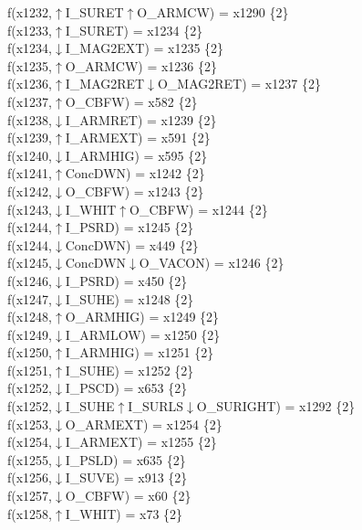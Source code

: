 f(x1232,$\uparrow$I\_SURET$\uparrow$O\_ARMCW) = x1290 \{2\} \\  
f(x1233,$\uparrow$I\_SURET) = x1234 \{2\} \\  
f(x1234,$\downarrow$I\_MAG2EXT) = x1235 \{2\} \\  
f(x1235,$\uparrow$O\_ARMCW) = x1236 \{2\} \\  
f(x1236,$\uparrow$I\_MAG2RET$\downarrow$O\_MAG2RET) = x1237 \{2\} \\  
f(x1237,$\uparrow$O\_CBFW) = x582 \{2\} \\  
f(x1238,$\downarrow$I\_ARMRET) = x1239 \{2\} \\  
f(x1239,$\uparrow$I\_ARMEXT) = x591 \{2\} \\  
f(x1240,$\downarrow$I\_ARMHIG) = x595 \{2\} \\  
f(x1241,$\uparrow$ConcDWN) = x1242 \{2\} \\  
f(x1242,$\downarrow$O\_CBFW) = x1243 \{2\} \\  
f(x1243,$\downarrow$I\_WHIT$\uparrow$O\_CBFW) = x1244 \{2\} \\  
f(x1244,$\uparrow$I\_PSRD) = x1245 \{2\} \\  
f(x1244,$\downarrow$ConcDWN) = x449 \{2\} \\  
f(x1245,$\downarrow$ConcDWN$\downarrow$O\_VACON) = x1246 \{2\} \\  
f(x1246,$\downarrow$I\_PSRD) = x450 \{2\} \\  
f(x1247,$\downarrow$I\_SUHE) = x1248 \{2\} \\  
f(x1248,$\uparrow$O\_ARMHIG) = x1249 \{2\} \\  
f(x1249,$\downarrow$I\_ARMLOW) = x1250 \{2\} \\  
f(x1250,$\uparrow$I\_ARMHIG) = x1251 \{2\} \\  
f(x1251,$\uparrow$I\_SUHE) = x1252 \{2\} \\  
f(x1252,$\downarrow$I\_PSCD) = x653 \{2\} \\  
f(x1252,$\downarrow$I\_SUHE$\uparrow$I\_SURLS$\downarrow$O\_SURIGHT) = x1292 \{2\} \\  
f(x1253,$\downarrow$O\_ARMEXT) = x1254 \{2\} \\  
f(x1254,$\downarrow$I\_ARMEXT) = x1255 \{2\} \\  
f(x1255,$\downarrow$I\_PSLD) = x635 \{2\} \\  
f(x1256,$\downarrow$I\_SUVE) = x913 \{2\} \\  
f(x1257,$\downarrow$O\_CBFW) = x60 \{2\} \\  
f(x1258,$\uparrow$I\_WHIT) = x73 \{2\} \\  
